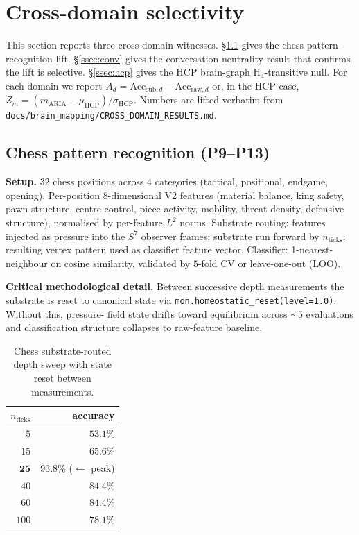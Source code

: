 \section{Cross-domain selectivity}\label{sec:cross_domain}

This section reports three cross-domain witnesses. \S\ref{ssec:chess}
gives the chess pattern-recognition lift. \S\ref{ssec:conv} gives the
conversation neutrality result that confirms the lift is selective.
\S\ref{ssec:hcp} gives the HCP brain-graph H$_4$-transitive null.
For each domain we report
$A_{d} = \mathrm{Acc}_{\mathrm{sub}, d} - \mathrm{Acc}_{\mathrm{raw}, d}$
or, in the HCP case,
$Z_{m} = (m_{\mathrm{ARIA}} - \mu_{\mathrm{HCP}})/\sigma_{\mathrm{HCP}}$.
Numbers are lifted verbatim from
\texttt{docs/brain\_mapping/CROSS\_DOMAIN\_RESULTS.md}.

\subsection{Chess pattern recognition (P9--P13)}\label{ssec:chess}

\textbf{Setup.} $32$ chess positions across $4$ categories (tactical,
positional, endgame, opening). Per-position $8$-dimensional V2
features (material balance, king safety, pawn structure, centre
control, piece activity, mobility, threat density, defensive
structure), normalised by per-feature $L^{2}$ norms. Substrate
routing: features injected as pressure into the $S^{7}$ observer
frames; substrate run forward by $n_{\mathrm{ticks}}$; resulting
vertex pattern used as classifier feature vector. Classifier:
1-nearest-neighbour on cosine similarity, validated by $5$-fold CV
or leave-one-out (LOO).

\textbf{Critical methodological detail.} Between successive depth
measurements the substrate is reset to canonical state via
\texttt{mon.homeostatic\_reset(level=1.0)}. Without this, pressure-
field state drifts toward equilibrium across $\sim 5$ evaluations
and classification structure collapses to raw-feature baseline.

\begin{table}[ht]
\centering
\small
\caption{Chess substrate-routed depth sweep with state reset between
measurements.}
\label{tab:chess_depth}
\begin{tabular}{r r}
\toprule
$n_{\mathrm{ticks}}$ & accuracy \\
\midrule
$5$    & $53.1\%$ \\
$15$   & $65.6\%$ \\
$\mathbf{25}$  & $\mathbf{93.8\%}$ ($\leftarrow$ peak) \\
$40$   & $84.4\%$ \\
$60$   & $84.4\%$ \\
$100$  & $78.1\%$ \\
\bottomrule
\end{tabular}
\end{table}

